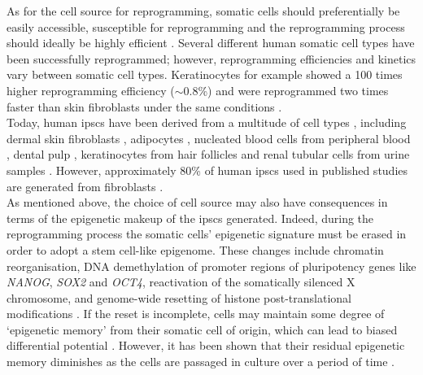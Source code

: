 As for the cell source for reprogramming, somatic cells should preferentially be easily accessible, susceptible for reprogramming and the reprogramming process should ideally be highly efficient \cite{brouwer2016choices}. 
Several different human somatic cell types have been successfully reprogrammed; however, reprogramming efficiencies and kinetics vary between somatic cell types. 
Keratinocytes for example showed a 100 times higher reprogramming efficiency ($\sim$0.8\%) and were reprogrammed two times faster than skin fibroblasts under the same conditions \cite{aasen2008efficient}. \\

Today, human \glspl{ipsc} have been derived from a multitude of cell types \cite{doss2019current}, including dermal skin fibroblasts \cite{takahashi2007induction, yu2007induced}, adipocytes \cite{sugii2010human}, nucleated blood cells from peripheral blood \cite{loh2009generation, seki2010generation}, dental pulp \cite{yan2010ips},
keratinocytes from hair follicles \cite{aasen2008efficient} and
renal tubular cells from urine samples \cite{cao2018generation}.
However, approximately 80\% of human \glspl{ipsc} used in published studies are generated from fibroblasts \cite{takahashi2016decade}. \\

As mentioned above, the choice of cell source may also have consequences in terms of the epigenetic makeup of the \glspl{ipsc} generated.
Indeed, during the reprogramming process the somatic cells' epigenetic signature must be erased in order to adopt a stem cell-like epigenome.
These changes include chromatin reorganisation, DNA demethylation of promoter regions of pluripotency genes like \textit{NANOG}, \textit{SOX2} and \textit{OCT4}, reactivation of the somatically silenced X chromosome, and genome-wide resetting of histone post-translational modifications \cite{takahashi2007induction, maherali2007directly, wernig2007vitro, buganim2013mechanisms}.
If the reset is incomplete, cells may maintain some degree of `epigenetic memory' from their somatic cell of origin, which can lead to biased differential potential \cite{kim2010epigenetic, polo2010cell}.
However, it has been shown that their residual epigenetic memory diminishes as the cells are passaged in culture over a period of time \cite{ghosh2010persistent}.

